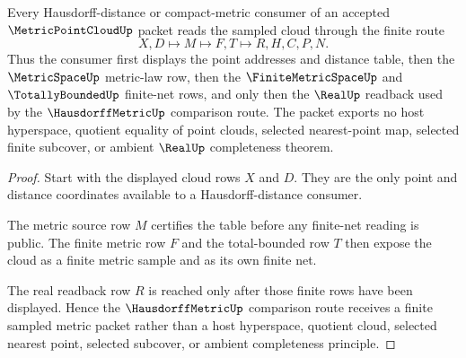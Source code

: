 \begin{theorem}
\label{thm:metric-point-cloud-hausdorff-sample-route}
Every Hausdorff-distance or compact-metric consumer of an accepted $\MetricPointCloudUp$ packet reads the sampled cloud through the finite route
$$
X,D \longmapsto M \longmapsto F,T \longmapsto R,H,C,P,N .
$$
Thus the consumer first displays the point addresses and distance table, then the $\MetricSpaceUp$ metric-law row, then the $\FiniteMetricSpaceUp$ and $\TotallyBoundedUp$ finite-net rows, and only then the $\RealUp$ readback used by the $\HausdorffMetricUp$ comparison route. The packet exports no host hyperspace, quotient equality of point clouds, selected nearest-point map, selected finite subcover, or ambient $\RealUp$ completeness theorem.
\end{theorem}
\begin{proof}
Start with the displayed cloud rows $X$ and $D$. They are the only point and distance coordinates available to a Hausdorff-distance consumer.

The metric source row $M$ certifies the table before any finite-net reading is public. The finite metric row $F$ and the total-bounded row $T$ then expose the cloud as a finite metric sample and as its own finite net.

The real readback row $R$ is reached only after those finite rows have been displayed. Hence the $\HausdorffMetricUp$ comparison route receives a finite sampled metric packet rather than a host hyperspace, quotient cloud, selected nearest point, selected subcover, or ambient completeness principle.
\end{proof}





